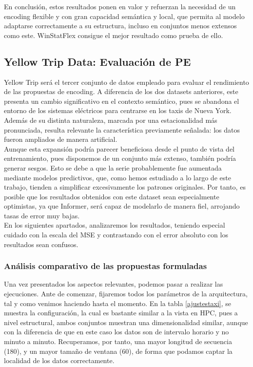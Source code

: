En conclusión, estos resultados ponen en valor y refuerzan la necesidad de un encoding flexible y con gran capacidad semántica y local, que permita al modelo adaptarse correctamente a su estructura, incluso en conjuntos menos extensos como este. WinStatFlex consigue el mejor resultado como prueba de ello.

\subsection{Yellow Trip Data: Evaluación de PE}

Yellow Trip será el tercer conjunto de datos empleado para evaluar el rendimiento de las propuestas de encoding. A diferencia de los dos datasets anteriores, este presenta un cambio significativo en el contexto semántico, pues se abandona el entorno de los sistemas eléctricos para centrarse en los taxis de Nueva York. Además de su distinta naturaleza, marcada por una estacionalidad más pronunciada, resulta relevante la característica previamente señalada: los datos fueron ampliados de manera artificial. \\

Aunque esta expansión podría parecer beneficiosa desde el punto de vista del entrenamiento, pues disponemos de un conjunto más extenso, también podría generar sesgos. Esto se debe a que la serie probablemente fue aumentada mediante modelos predictivos, que, como hemos estudiado a lo largo de este trabajo, tienden a simplificar excesivamente los patrones originales. Por tanto, es posible que los resultados obtenidos con este dataset sean especialmente optimistas, ya que Informer, será capaz de modelarlo de manera fiel, arrojando tasas de error muy bajas.\\

En los siguientes apartados, analizaremos los resultados, teniendo especial cuidado con la escala del MSE y contrastando con el error absoluto con los resultados sean confusos.

\subsubsection{Análisis comparativo de las propuestas formuladas}

Una vez presentados los aspectos relevantes, podemos pasar a realizar las ejecuciones. Ante de comenzar, fijaremos todos los parámetros de la arquitectura, tal y como venimos haciendo hasta el momento. En la tabla \ref{ajustestaxi}, se muestra la configuración, la cual es bastante similar a la vista en HPC, pues a nivel estructural, ambos conjuntos muestran una dimensionalidad similar, aunque con la diferencia de que en este caso los datos son de intervalo horario y no minuto a minuto. Recuperamos, por tanto, una mayor longitud de secuencia (180), y un mayor tamaño de ventana (60), de forma que podamos captar la localidad de los datos correctamente.

